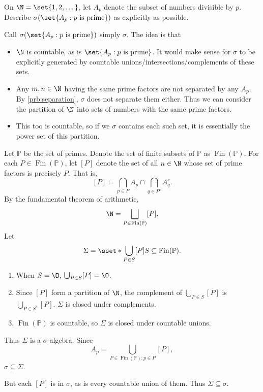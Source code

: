 \documentclass[12pt]{article}
\newcommand\finpow[1]{\operatorname{Fin}(#1)}
\newcommand\pr{\mathbb P}
\newcommand\finpr{\finpow{\pr}}
\begin{document}
\begin{problem}
    On $\N = \set{1, 2, \dots}$, let $A_p$ denote the subset of numbers
    divisible by $p$.
    Describe $\sigma(\set{A_p : p \text{ is prime}})$ as explicitly
    as possible.
\end{problem}
Call $\sigma(\set{A_p : p \text{ is prime}})$ simply $\sigma$.
The idea is that
\begin{itemize}
    \item $\N$ is countable, as is $\set{A_p : p \text{ is prime}}$.
    It would make sense for $\sigma$ to be explicitly generated by countable
    unions/intersections/complements of these sets.
    \item Any $m, n \in \N$ having the same prime factors are not separated
    by any $A_p$.
    By \cref{prb:separation}, $\sigma$ does not separate them either.
    Thus we can consider the partition of $\N$ into sets of numbers
    with the same prime factors.
    \item This too is countable, so if we $\sigma$ contains each such set,
    it is essentially the power set of this partition.
\end{itemize}
\begin{solution}
    Let $\pr$ be the set of primes.
    Denote the set of finite subsets of $\pr$ as
    $\finpr$.
    For each $P \in \finpr$, let $[P]$ denote the set of all
    $n \in \N$ whose set of prime factors is precisely $P$.
    That is, \[
        [P] = \bigcap_{p \in P} A_p \cap
            \bigcap_{q \in P^c} A_q^c.
    \] By the fundamental theorem of arithmetic, \[
        \N = \bigsqcup_{P \in \finpr} [P].
    \] Let \[
        \Sigma = \sset*{\bigcup_{P \in S} [P]}
            {S \subseteq \finpr}.
    \]
    \begin{enumerate}
        \item When $S = \O$, $\bigcup_{P \in S} [P] = \O$.
        \item Since $[P]$ form a partition of $\N$,
            the complement of $\bigcup_{P \in S} [P]$ is
            $\bigcup_{P \in S^c} [P]$.
            $\Sigma$ is closed under complements.
        \item $\finpr$ is countable, so $\Sigma$ is closed under countable
            unions.
    \end{enumerate}
    Thus $\Sigma$ is a $\sigma$-algebra.
    Since \[
        A_p = \bigcup_{P \in \finpr : p \in P} [P],
    \] $\sigma \subseteq \Sigma$.

    But each $[P]$ is in $\sigma$,
    as is every countable union of them.
    Thus $\Sigma \subseteq \sigma$.
\end{solution}
\end{document}
